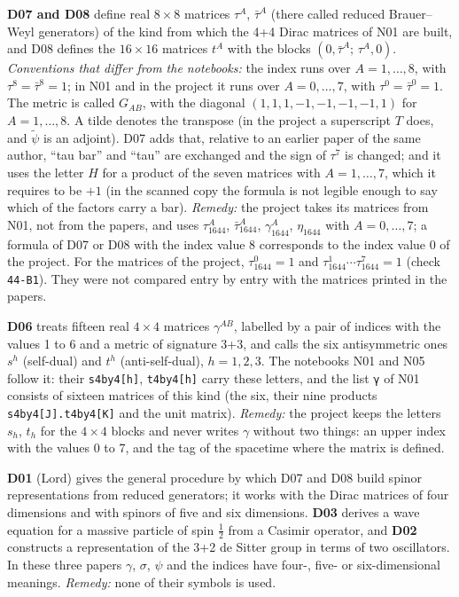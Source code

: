 \documentclass[
  10pt,
]{article}
\begin{document}
\textbf{D07 and D08} define real \(8\times8\) matrices \(\tau^A\),
\(\bar\tau^A\) (there called reduced Brauer--Weyl generators) of the
kind from which the 4+4 Dirac matrices of N01 are built, and D08 defines
the \(16\times16\) matrices \(t^A\) with the blocks
\((0,\bar\tau^A;\,\tau^A,0)\). \emph{Conventions that differ from the
notebooks:} the index runs over \(A=1,\dots,8\), with
\(\tau^8=\bar\tau^8=1\); in N01 and in the project it runs over
\(A=0,\dots,7\), with \(\tau^0=\bar\tau^0=1\). The metric is called
\(G_{AB}\), with the diagonal \((1,1,1,-1,-1,-1,-1,1)\) for
\(A=1,\dots,8\). A tilde denotes the transpose (in the project a
superscript \(T\) does, and \(\tilde\psi\) is an adjoint). D07 adds
that, relative to an earlier paper of the same author, ``tau bar'' and
``tau'' are exchanged and the sign of \(\tau^7\) is changed; and it uses
the letter \(H\) for a product of the seven matrices with
\(A=1,\dots,7\), which it requires to be \(+1\) (in the scanned copy the
formula is not legible enough to say which of the factors carry a bar).
\emph{Remedy:} the project takes its matrices from N01, not from the
papers, and uses \(\tau_{1644}^A\), \(\bar\tau_{1644}^A\),
\(\gamma_{1644}^A\), \(\eta_{1644}\) with \(A=0,\dots,7\); a formula of
D07 or D08 with the index value 8 corresponds to the index value 0 of
the project. For the matrices of the project, \(\tau_{1644}^0=1\) and
\(\tau_{1644}^1\cdots\tau_{1644}^7=1\) (check \texttt{44-B1}). They were
not compared entry by entry with the matrices printed in the papers.

\textbf{D06} treats fifteen real \(4\times4\) matrices \(\gamma^{AB}\),
labelled by a pair of indices with the values 1 to 6 and a metric of
signature 3+3, and calls the six antisymmetric ones \(s^h\) (self-dual)
and \(t^h\) (anti-self-dual), \(h=1,2,3\). The notebooks N01 and N05
follow it: their \texttt{s4by4{[}h{]}}, \texttt{t4by4{[}h{]}} carry
these letters, and the list \texttt{γ} of N01 consists of sixteen
matrices of this kind (the six, their nine products
\texttt{s4by4{[}J{]}.t4by4{[}K{]}} and the unit matrix). \emph{Remedy:}
the project keeps the letters \(s_h\), \(t_h\) for the \(4\times4\)
blocks and never writes \(\gamma\) without two things: an upper index
with the values 0 to 7, and the tag of the spacetime where the matrix is
defined.

\textbf{D01} (Lord) gives the general procedure by which D07 and D08
build spinor representations from reduced generators; it works with the
Dirac matrices of four dimensions and with spinors of five and six
dimensions. \textbf{D03} derives a wave equation for a massive particle
of spin \(\tfrac12\) from a Casimir operator, and \textbf{D02}
constructs a representation of the 3+2 de Sitter group in terms of two
oscillators. In these three papers \(\gamma\), \(\sigma\), \(\psi\) and
the indices have four-, five- or six-dimensional meanings.
\emph{Remedy:} none of their symbols is used.
\end{document}
